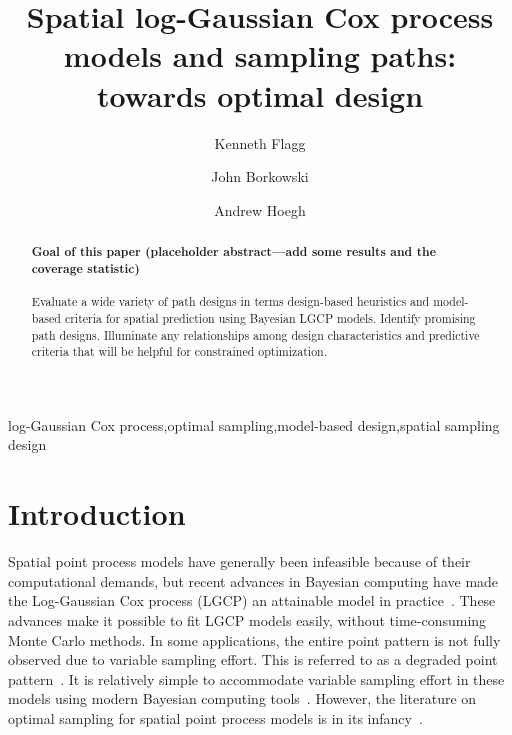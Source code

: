 \documentclass[review]{elsarticle}
\begin{document}
\begin{frontmatter}

\title{Spatial log-Gaussian Cox process models and sampling paths: towards optimal design}

\author[msuaddr]{Kenneth Flagg}

\author[msuaddr]{John Borkowski}
\author[msuaddr]{Andrew Hoegh}

\address[msuaddr]{Department of Mathematical Sciences, Montana State University, Bozeman, MT 59717}

\begin{abstract}

\paragraph{Goal of this paper (placeholder abstract---add some results and the
coverage statistic)} Evaluate a wide variety of path designs in terms
design-based heuristics and model-based criteria for spatial prediction using
Bayesian LGCP models. Identify promising path designs. Illuminate any
relationships among design characteristics and predictive criteria that will be
helpful for constrained optimization.

\end{abstract}

\begin{keyword}
log-Gaussian Cox process\sep optimal sampling\sep model-based design\sep spatial sampling design
\end{keyword}

\end{frontmatter}

\linenumbers



\section{Introduction}

Spatial point process models have generally been infeasible because of their
computational demands, but recent advances in Bayesian computing have made the
Log-Gaussian Cox process (LGCP) an attainable model in
practice~\citep{rueetal, lindgrenetal, illianetal, simpsonetal}. These advances
make it possible to fit LGCP models easily, without time-consuming Monte Carlo
methods. In some applications, the entire point pattern is not fully observed
due to variable sampling effort. This is referred to as a degraded point
pattern~\citep{chakrabortyetal}. It is relatively simple to accommodate
variable sampling effort in these models using modern Bayesian computing
tools~\citep{yuanetal}. However, the literature on optimal sampling for spatial
point process models is in its infancy~\citep{liuvanhatalo}.
\end{document}
